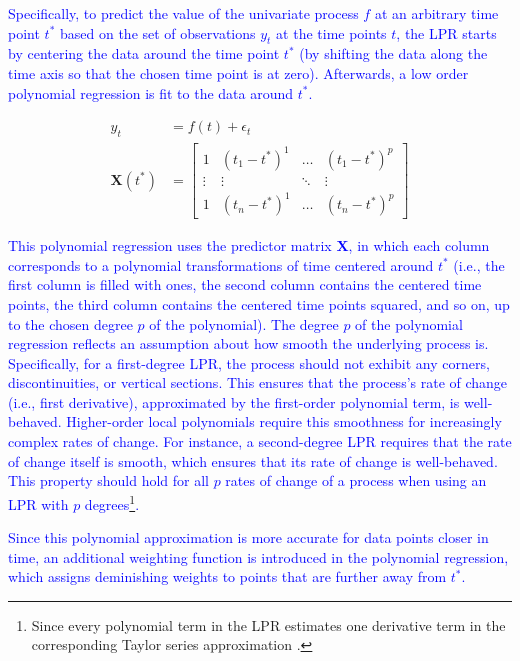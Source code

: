 \documentclass[man, floatsintext]{apa7}
\begin{document}
\textcolor{blue}{
  Specifically, to predict the value of the univariate process $f$ at an
  arbitrary time point $t^*$ based on the set of observations $y_t$ at the time
  points $t$, the LPR starts by centering the data around the time point $t^*$
  (by shifting the data along the time axis so that the chosen time point is at
  zero). Afterwards, a low order polynomial regression is fit to the data
  around $t^*$.
}

\begin{align}
  y_t             & = f(t) + \epsilon_t \\
  \textbf{X}(t^*) & =
  \begin{bmatrix}
    1      & (t_1 - t^*)^1 & \dots  & (t_1 - t^*)^p \\
    \vdots & \vdots        & \ddots & \vdots        \\
    1      & (t_n - t^*)^1 & \dots  & (t_n - t^*)^p
  \end{bmatrix}
  \label{eq:lpr_equations_mod_mat}
\end{align}

\noindent\textcolor{blue}{
  This polynomial regression uses the predictor matrix $\textbf{X}$, in which
  each column corresponds to a polynomial transformations of time centered
  around $t^*$ (i.e., the first column is filled with ones, the second column
  contains the centered time points, the third column contains the centered
  time points squared, and so on, up to the chosen degree $p$ of the
  polynomial). The degree $p$ of the polynomial regression reflects an
  assumption about how smooth the underlying process is. Specifically, for a
  first-degree LPR, the process should not exhibit any corners,
  discontinuities, or vertical sections. This ensures that the process's rate
  of change (i.e., first derivative), approximated by the first-order
  polynomial term, is well-behaved. Higher-order local polynomials require this
  smoothness for increasingly complex rates of change. For instance, a
  second-degree LPR requires that the rate of change itself is smooth, which
  ensures that its rate of change is well-behaved. This property should hold
  for all $p$ rates of change of a process when using an LPR with $p$
  degrees\footnote{Since every polynomial term in the LPR estimates one
    derivative term in the corresponding Taylor series approximation
    \parencite{avery_literature_nodate}.}.
}

\textcolor{blue}{
  Since this polynomial approximation is more accurate for data points closer
  in time, an additional weighting function is introduced in the polynomial
  regression, which assigns deminishing weights to points that are further away
  from $t^*$.
}
\end{document}
